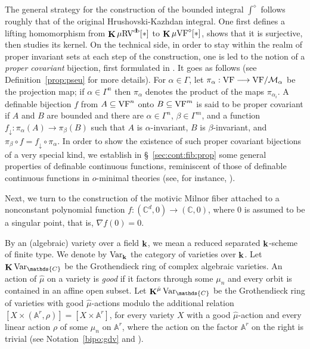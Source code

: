 \documentclass[12pt]{amsart}
\newcommand{\memph}[1]{{\color{magenta}\emph{#1}}}
\theoremstyle{plain}
\theoremstyle{definition}
\theoremstyle{remark}
\numberwithin{equation}{section}
\theoremstyle{plain}
\newcommand{\VF}{\textup{VF}}
\newcommand{\RV}{\textup{RV}}
\newcommand{\MM}{\mdl M}
\newcommand{\A}{\mathds{A}}
\newcommand{\C}{\mathds{C}}
\newcommand{\omin}{$o$\nobreakdash}
\newcommand{\0}{\emptyset}
\newcommand{\mdl}[1]{\mathcal{#1}}  %
\newcommand{\fun}{\longrightarrow}
\newcommand{\sub}{\subseteq}
\newcommand{\mgVF}{{\mu} {\VF}}
\newcommand{\mgRV}{{\mu}{\RV}}
\DeclareMathOperator{\ggk}{\mathbf{K}}
\DeclareMathOperator{\db}{d \! b}
\newcommand{\var}{\textup{Var}}
\DeclareMathOperator{\bfk}{\bf k}
\newcommand{\Var}{\textup{Var}}
\begin{document}
The general strategy for the construction of the bounded integral $\int^\diamond$ follows roughly that of the original Hrushovski-Kazhdan integral. One first defines a lifting homomorphism from $\ggk  \mgRV^{\db}[*]$ to $\ggk \mgVF^\diamond[*]$,  shows that it is surjective, then studies its kernel.
On the technical side, in order to stay within the realm of proper invariant sets at each step of the construction, one is led to the notion of a \memph{proper covariant} bijection, first formulated in \cite{hru:loe:lef}. It goes as follows (see Definition~\ref{prop:pseu} for more details). For $\alpha \in \Gamma$, let $\pi_\alpha : \VF\fun \VF/\MM_\alpha$ be the projection map;  if $\alpha\in \Gamma^n$ then $\pi_{\alpha}$ denotes the product of the maps $\pi_{\alpha_i}$. A definable bijection $f$ from $A\sub \VF^n$ onto  $B \sub \VF^m$ is said to be proper covariant if $A$ and $B$ are bounded and there are $\alpha \in \Gamma^n$, $\beta \in \Gamma^m$, and a function $f_\downarrow : \pi_{\alpha}(A) \fun \pi_{\beta}(B)$ such that $A$ is $\alpha$-invariant, $B$ is $\beta$-invariant, and  $\pi_\beta \circ f = f_\downarrow \circ \pi_\alpha$. In order to show the existence of such proper covariant bijections of a very special kind, we establish in \S~\ref{sec:cont:fib:prop} some general properties of definable continuous functions, reminiscent of those of definable continuous functions in \omin-minimal theories (see, for instance,  \cite[Chapter~6]{dries:1998}).


Next, we turn to the construction of the motivic Milnor fiber attached to a nonconstant polynomial function $f : (\C^d, 0) \fun (\C, 0)$,  where $0$ is assumed to be a singular point, that is, $\nabla f (0) = 0$.

By an (algebraic) variety over a field $\bfk$, we mean a reduced separated $\bfk$-scheme of finite type. We denote by $\Var_{\bfk}$ the category of  varieties over $\bfk$.
Let $\ggk \var_{\C}$ be the Grothendieck ring of complex algebraic varieties. An action of $\hat \mu$ on a variety is \memph{good} if it factors through some $\mu_n$ and every orbit is contained in an affine open subset. Let $\ggk^{\hat \mu} \var_{\C}$ be the Grothendieck ring of varieties with good $\hat \mu$-actions modulo the additional relation $[X \times (\A^r, \rho)] = [X \times \A^r]$, for every variety $X$ with a good $\hat \mu$-action and every linear action $\rho$ of some $\mu_n$ on $\A^r$, where the action on the factor $\A^r$ on the right is trivial (see Notation~\ref{bipo:gdv} and \cite[\S~2.4]{denefloeser:arc}).
\end{document}
